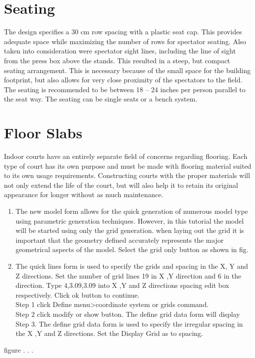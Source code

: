 \section{Seating}
The design specifies a 30 cm row spacing with a plastic seat cap. This provides adequate space 
while maximizing the number of rows for spectator seating. Also taken into consideration were 
spectator sight lines, including the line of sight from the press box above the stands. This resulted 
in a steep, but compact seating arrangement. This is necessary because of the small space for the 
building footprint, but also allows for very close proximity of the spectators to the field. 
The seating is recommended to be between 18 – 24 inches per person parallel to the seat way. 
The seating can be single seats or a bench system. 
\section{Floor Slabs}
Indoor courts have an entirely separate field of concerns regarding flooring. Each type of court has its own purpose and must be made with flooring material suited to its own usage requirements. Constructing courts with the proper materials will not only extend the life of the court, but will also help it to retain its original appearance for longer without as much maintenance. 








\begin{enumerate}
\item The new model form allows for the quick generation of numerous model type using parametric generation techniques. However, in this tutorial the model will be started using only the grid generation. when laying out the grid it is important that the geometry defined accurately  represents the major geometrical aspects of the model. Select the grid only button as shown in fig.
\item The quick lines form is used to specify the grids and spacing in the X, Y and Z directions. Set the number of grid lines 19 in X ,Y direction and 6 in the  direction. Type 4,3.09,3.09 into X ,Y and Z directions spacing edit box respectively. Click ok button to continue.\\
  Step 1 click Define menu>coordinate system or grids command.\\
  Step 2 click modify  or show button. The define grid data form will display\\
  Step 3. The define grid data form is used to specify the irregular spacing in the X ,Y and Z directions. Set the Display Grid as to spacing.\\

\end{enumerate}
figure
.
.
.
